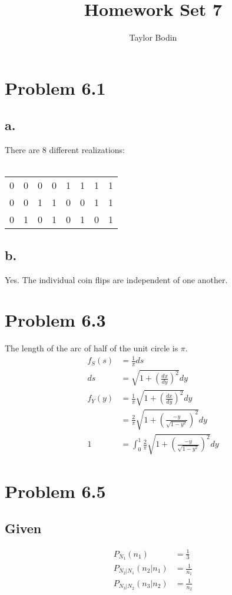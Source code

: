 \documentclass[12pt]{article}
\begin{document}
\title{Homework Set 7}
\author{Taylor Bodin}
\maketitle

\section{Problem 6.1}
\subsection{a.}
There are 8 different realizations: \\
\\
\begin{tabular}{ c | c | c | c | c | c | c | c }
  0 & 0 & 0 & 0 & 1 & 1 & 1 & 1 \\ 
  0 & 0 & 1 & 1 & 0 & 0 & 1 & 1 \\ 
  0 & 1 & 0 & 1 & 0 & 1 & 0 & 1
\end{tabular}

\subsection{b.}
Yes. The individual coin flips are independent of one another.

\section{Problem 6.3}
The length of the arc of half of the unit circle is $\pi$.
\begin{align*}
f_S(s) &= \frac{1}{\pi}ds \\
ds &= \sqrt{1+\left(\frac{dx}{dy}\right)^2}dy \\
f_Y(y) &= \frac{1}{\pi}\sqrt{1+\left(\frac{dx}{dy}\right)^2}dy \\
&= \frac{2}{\pi}\sqrt{1+\left(\frac{-y}{\sqrt{1-y^2}}\right)^2}dy \\
1 &= \int_0^1 \frac{2}{\pi}\sqrt{1+\left(\frac{-y}{\sqrt{1-y^2}}\right)^2}dy
\end{align*}
\section{Problem 6.5}
\subsection{Given}
\begin{align*}
  P_{N_1}(n_1) &= \frac{1}{3} \\
  P_{N_2|N_1}(n_2|n_1) &= \frac{1}{n_1} \\
  P_{N_3|N_2}(n_3|n_2) &= \frac{1}{n_2} \\
\end{align*}
\end{document}
